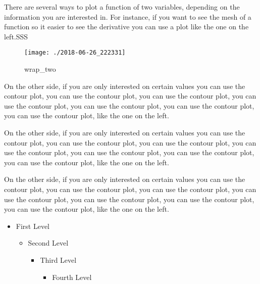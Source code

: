 \documentclass[12pt, letterpaper]{article}
\begin{document}
There are several ways to plot a function of two variables, 
depending on the information you are interested in. For 
instance, if you want to see the mesh of a function so it 
easier to see the derivative you can use a plot like the 
one on the left.SSS

\begin{wrapfigure}{l}{0.25\textwidth}	%
	\centering	%
	\texttt{[image: ./2018-06-26\_222331]}
	\caption{wrap\_two}
\end{wrapfigure}

On the other side, if you are only interested on 
certain values you can use the contour plot, you 
can use the contour plot, you can use the contour 
plot, you can use the contour plot, you can use 
the contour plot, you can use the contour plot, 
you can use the contour plot, like the one on the left.
 
On the other side, if you are only interested on 
certain values you can use the contour plot, you 
can use the contour plot, you can use the contour 
plot, you can use the contour plot, you can use the 
contour plot, you can use the contour plot, 
you can use the contour plot, 
like the one on the left.

On the other side, if you are only interested on 
certain values you can use the contour plot, you 
can use the contour plot, you can use the contour 
plot, you can use the contour plot, you can use the 
contour plot, you can use the contour plot, 
you can use the contour plot, 
like the one on the left.

\begin{comment}
	\DeclareGraphicsExtensions{.png,.pdf}
	\DeclareGraphicsExtensions{.pdf,.png}
\begin{comment}

\listoffigures

\textbf{Unordered lists}

\begin{comment}
The default label scheme for itemized lists is:
Level 1 is \textbullet (•),
Level 2 is \textendash (–) ,
Level 3 is \textasteriskcentered (*)
Level 4 is \textperiodcentered (·).
\end{comment}

\begin{itemize}
	\item First Level
	\begin{itemize}
		\item Second Level
		\begin{itemize}
			\item Third Level
			\begin{itemize}
				\item Fourth Level
			\end{itemize}
		\end{itemize}
	\end{itemize}
\end{itemize}
\end{document}
